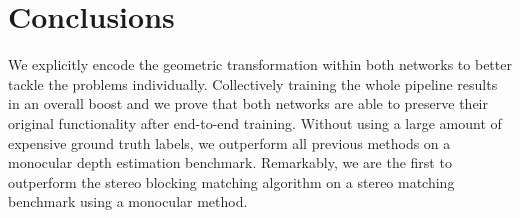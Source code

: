 \documentclass[10pt,twocolumn,letterpaper]{article}
\begin{document}
\section{Conclusions}
We explicitly encode the geometric transformation within both networks to better tackle the problems individually. Collectively training the whole pipeline results in an overall boost and we prove that both networks are able to preserve their original functionality after end-to-end training. Without using a large amount of expensive ground truth labels, we outperform all previous methods on a monocular depth estimation benchmark. Remarkably, we are the first to outperform the stereo blocking matching algorithm on a stereo matching benchmark using a monocular method.\par

{\small


}
\end{document}

